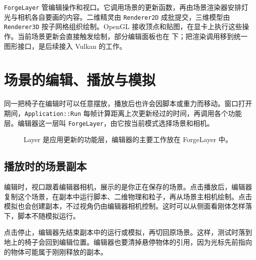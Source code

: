 \documentclass[UTF8,fontset=fandol,10pt,a4paper]{ctexart}
\newcommand{\code}[1]{{\small\texttt{#1}}}
\newcommand{\ruleline}{\par\vspace{-4pt}{\color{line}\hrule}\vspace{8pt}}
\begin{document}
\code{ForgeLayer} 管编辑操作和视口。它调用场景的更新函数，再由场景渲染器安排灯光与相机各自要画的内容。二维精灵由 \code{Renderer2D} 成批提交，三维模型由 \code{Renderer3D} 按子网格组织绘制。OpenGL 接收顶点和贴图，在显卡上执行这些操作。当前场景更新会直接触发绘制，部分编辑面板也在  下；把渲染调用移到统一图形接口，是后续接入 Vulkan 的工作。

\clearpage
\section{场景的编辑、播放与模拟}\ruleline
同一把椅子在编辑时可以任意摆放，播放后也许会因脚本或重力而移动。窗口打开期间，\code{Application::Run} 每帧计算距离上次更新经过的时间，再调用各个功能层。编辑器这一层叫 \code{ForgeLayer}，由它按当前模式选择场景和相机。

\begin{figure}[H]\centering
{}\caption{Layer 是应用更新的功能层，编辑器的主要工作放在 ForgeLayer 中。}\end{figure}
\subsection{播放时的场景副本}
编辑时，视口跟着编辑器相机，展示的是你正在保存的场景。点击播放后，编辑器复制这个场景，在副本中运行脚本、二维物理和粒子，再从场景主相机绘制。点击模拟也会创建副本，不过视角仍由编辑器相机控制。这时可以从侧面看刚体怎样落下，脚本不随模拟运行。

点击停止，编辑器先结束副本中的运行或模拟，再切回原场景。这样，测试时落到地上的椅子会回到编辑位置。编辑器也要清掉悬停物体的引用，因为光标先前指向的物体可能属于刚刚释放的副本。
\end{document}
